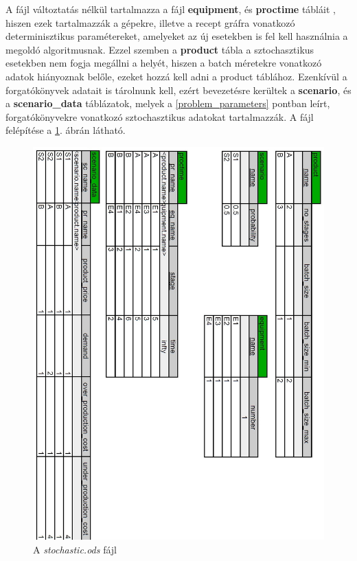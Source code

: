 A  fájl változtatás nélkül tartalmazza a  fájl \textbf{equipment}, és \textbf{proctime} tábláit , hiszen ezek tartalmazzák a gépekre, illetve a recept gráfra vonatkozó determinisztikus paramétereket, amelyeket az új esetekben is fel kell használnia a megoldó algoritmusnak.
Ezzel szemben a \textbf{product} tábla a sztochasztikus esetekben nem fogja megállni a helyét, hiszen a batch méretekre vonatkozó adatok hiányoznak belőle, ezeket hozzá kell adni a product táblához.
Ezenkívül a forgatókönyvek adatait is tárolnunk kell, ezért bevezetésre kerültek a\textbf{ scenario}, és a \textbf{scenario\_data} táblázatok, melyek a \ref{problem_parameters} pontban leírt, forgatókönyvekre vonatkozó sztochasztikus adatokat tartalmazzák.
A  fájl felépítése a \ref{stochastic_odshere}. ábrán látható.
\begin{figure}[hbtp]
\begin{center}
\includegraphics[scale=0.58]{stochasticOds}
\caption{A \textit{stochastic.ods} fájl}
\label{stochastic_odshere}
\end{center}
\end{figure}

